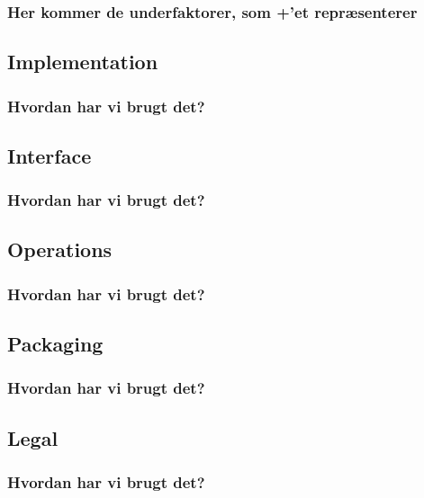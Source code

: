 \subsubsection*{Her kommer de underfaktorer, som +'et repræsenterer}
\subsection{Implementation}
\subsubsection*{Hvordan har vi brugt det?}
\subsection{Interface}
\subsubsection*{Hvordan har vi brugt det?}
\subsection{Operations}
\subsubsection*{Hvordan har vi brugt det?}
\subsection{Packaging}
\subsubsection*{Hvordan har vi brugt det?}
\subsection{Legal}
\subsubsection*{Hvordan har vi brugt det?}